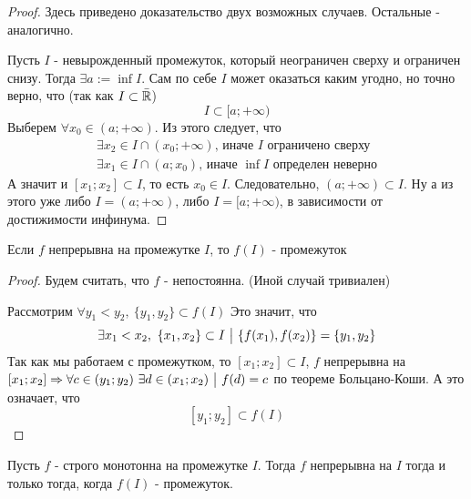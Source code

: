 \begin{proof}
	Здесь приведено доказательство двух возможных случаев. Остальные - аналогично.
	
	Пусть $I$ - невырожденный промежуток, который неограничен сверху и ограничен снизу. Тогда $\exists a := \inf I$. Сам по себе $I$ может оказаться каким угодно, но точно верно, что (так как $I \subset \bar{\mathbb{R}}$)
	$$
		I \subset [a; +\infty)
	$$
	Выберем $\forall x_0 \in (a; +\infty)$. Из этого следует, что
	\begin{align*}
		\exists x_2 \in I \cap (x_0; +\infty) \text{, иначе } I \text{ ограничено сверху}
		\\
		\exists x_1 \in I \cap (a; x_0) \text{, иначе } \inf I \text{ определен неверно}
	\end{align*}
	А значит и $[x_1; x_2] \subset I$, то есть $x_0 \in I$. Следовательно,
	$(a;+\infty) \subset I$. Ну а из этого уже либо $I = (a; +\infty)$, либо $I = [a; +\infty)$, в зависимости от достижимости инфинума.
\end{proof}

\begin{lemma}
	Если $f$ непрерывна на промежутке $I$, то $f(I)$ - промежуток
\end{lemma}

\begin{proof}
	Будем считать, что $f$ - непостоянна. (Иной случай тривиален)
	
	Рассмотрим $\forall y_1 < y_2,\ \{y_1, y_2\} \subset f(I)$
	Это значит, что
	$$
		\exists x_1 < x_2,\ \{x_1, x_2\} \subset I \such \{f(x_1), f(x_2)\} = \{y_1, y_2\}
	$$
	Так как мы работаем с промежутком, то $[x_1; x_2] \subset I$, $f$ непрерывна на $[x_1; x_2] \Rightarrow \forall c \in (y_1; y_2)\ \exists d \in (x_1; x_2) \ \big|\  f(d) = c$ по теореме Больцано-Коши. А это означает, что
	$$
		[y_1; y_2] \subset f(I)
	$$
\end{proof}

\begin{lemma} \label{for_back}
	Пусть $f$ - строго монотонна на промежутке $I$. Тогда $f$ непрерывна на $I$ тогда и только тогда, когда $f(I)$ - промежуток.
\end{lemma}

